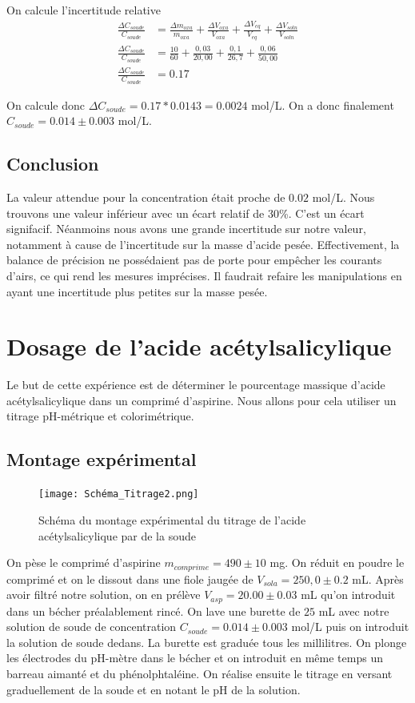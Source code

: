 \documentclass[12pt]{article}
\begin{document}
On calcule l'incertitude relative
\begin{align*}
\frac{\Delta C_{soude}}{C_{soude}}&=\frac{\Delta m_{oxa}}{ m_{oxa}} +\frac{\Delta V_{oxa}}{ V_{oxa}} + \frac{\Delta V_{eq}}{V_{eq}} + \frac{\Delta V_{soln}}{V_{soln}} \\
\frac{\Delta C_{soude}}{C_{soude}}&= \frac{10}{60} + \frac{0,03}{20,00} + \frac{0,1}{26,7} + \frac{0,06}{50,00} \\
\frac{\Delta C_{soude}}{C_{soude}}&= 0.17 
\end{align*}

On calcule donc $\Delta C_{soude}=0.17*0.0143 = 0.0024$ mol/L. On a donc finalement $C_{soude}=0.014\pm 0.003$ mol/L.

	\subsection{Conclusion}
	
La valeur attendue pour la concentration était proche de $0.02$ mol/L. Nous trouvons une valeur inférieur avec un écart relatif de 30\%. C'est un écart signifacif. Néanmoins nous avons une grande incertitude sur notre valeur, notamment à cause de l'incertitude sur la masse d'acide pesée. Effectivement, la balance de précision ne possédaient pas de porte pour empêcher les courants d'airs, ce qui rend les mesures imprécises. Il faudrait refaire les manipulations en ayant une incertitude plus petites sur la masse pesée. 	
	
\section{Dosage de l'acide acétylsalicylique}
Le but de cette expérience est de déterminer le pourcentage massique d'acide acétylsalicylique dans un comprimé d'aspirine. Nous allons pour cela utiliser un titrage pH-métrique et colorimétrique. 

	\subsection{Montage expérimental}
\begin{figure}[h!]
	\begin{center}
		\texttt{[image: Schéma\_Titrage2.png]}
		\label{Schéma_Titrage2}
		\caption{Schéma du montage expérimental du titrage de l'acide acétylsalicylique par de la soude}
	\end{center}
\end{figure}
On pèse le comprimé d'aspirine $m_{comprime}=490\pm 10$ mg. On réduit en poudre le comprimé et on le dissout dans une fiole jaugée de $V_{sola}=250,0\pm 0.2$ mL. Après avoir filtré notre solution, on en prélève $V_{asp}=20.00\pm 0.03$ mL qu'on introduit dans un bécher préalablement rincé. On lave une burette de $25$ mL avec notre solution de soude de concentration $C_{soude}=0.014\pm 0.003$ mol/L puis on introduit la solution de soude dedans. La burette est graduée tous les millilitres. On plonge les électrodes du pH-mètre dans le bécher et on introduit en même temps un barreau aimanté et du phénolphtaléine. On réalise ensuite le titrage en versant graduellement de la soude et en notant le pH de la solution. 
\end{document}
